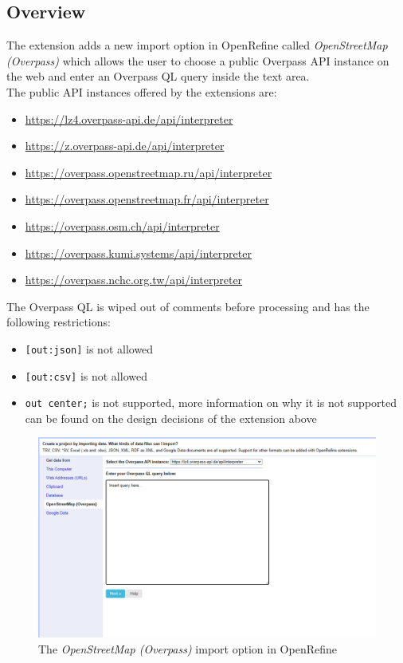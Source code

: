 \subsection{Overview}
The extension adds a new import option in OpenRefine called \textit{OpenStreetMap (Overpass)} which allows the user to choose a
public Overpass API instance on the web and enter an Overpass QL query inside the text area.\\
\newline
The public API instances offered by the extensions are:
\begin{itemize}
    \item \href{https://lz4.overpass-api.de/api/interpreter}{https://lz4.overpass-api.de/api/interpreter}
    \item \href{https://z.overpass-api.de/api/interpreter}{https://z.overpass-api.de/api/interpreter}
    \item \href{https://overpass.openstreetmap.ru/api/interpreter}{https://overpass.openstreetmap.ru/api/interpreter}
    \item \href{https://overpass.openstreetmap.fr/api/interpreter}{https://overpass.openstreetmap.fr/api/interpreter}
    \item \href{https://overpass.osm.ch/api/interpreter}{https://overpass.osm.ch/api/interpreter}
    \item \href{https://overpass.kumi.systems/api/interpreter}{https://overpass.kumi.systems/api/interpreter}
    \item \href{https://overpass.nchc.org.tw/api/interpreter}{https://overpass.nchc.org.tw/api/interpreter}
\end{itemize}
The Overpass QL is wiped out of comments before processing and has the following restrictions:
\begin{itemize}
    \item \texttt{[out:json]} is not allowed
    \item \texttt{[out:csv]} is not allowed
    \item \texttt{out center;} is not supported, more information on why it is not supported can be found
    on the design decisions of the extension above
\end{itemize}
\begin{figure}[H]
    \includegraphics[width=\linewidth]{./Figures/OSM_Extractor/osm_extractor_import_page.png}
    \caption{The \textit{OpenStreetMap (Overpass)} import option in OpenRefine}
\end{figure}
